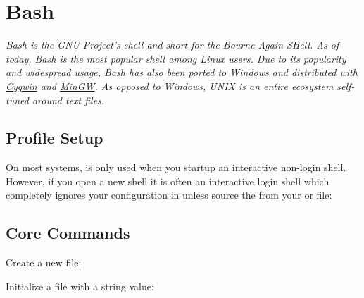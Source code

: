 \section{Bash}\label{bash}

\begin{flushleft}
	\emph{Bash is the GNU Project's shell and short for the Bourne Again SHell.
		As of today, Bash is the most popular shell among Linux users. Due to its
		popularity and widespread usage, Bash has also been ported to Windows and
		distributed with \href{https://cygwin.com/}{Cygwin} and
		\href{https://osdn.net/projects/mingw/}{MinGW}. As opposed to Windows,
		UNIX is an entire ecosystem self-tuned around text files.}
\end{flushleft}

\subsection{Profile Setup}\label{bash-profile}

\begin{flushleft}
	On most systems,  is only used when you startup an interactive
	non-login shell. However, if you open a new shell it is often an interactive login
	shell which completely ignores your configuration in  unless
	source the  from your  or 
	file:
\end{flushleft}

\begin{flushleft}
\end{flushleft}

\subsection{Core Commands}\label{bash-core-commands}

\begin{flushleft}
	Create a new file:
\end{flushleft}

\begin{flushleft}
\end{flushleft}

\begin{flushleft}
	Initialize a  file with a string value:
\end{flushleft}

\begin{flushleft}
\end{flushleft}

